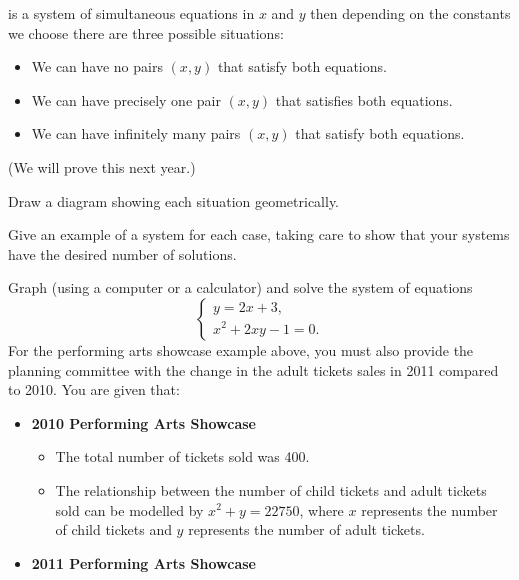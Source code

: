 \begin{questions}
            is a system of simultaneous equations in $ x $ and $ y $ then depending on the constants we choose there are
            three possible situations:
            \begin{itemize}
              \item We can have no pairs $ (x,y) $ that satisfy both equations.
              \item We can have precisely one pair $ (x,y) $ that satisfies both equations.
              \item We can have infinitely many pairs $ (x,y) $ that satisfy both equations.
            \end{itemize}
            (We will prove this next year.)
    \begin{parts}
      \item Draw a diagram showing each situation geometrically.
      \item Give an example of a system for each case, taking care to show that your systems
            have the desired number of solutions.
    \end{parts}
  \question Graph (using a computer or a calculator) and solve the system of equations
            \begin{displaymath}
              \begin{cases}
                y = 2x + 3,\\
                x^2 + 2xy - 1 = 0.
              \end{cases}
            \end{displaymath}
   For the performing arts showcase example above, you must
            also provide the planning committee with the change in the adult tickets sales in 2011 compared to 2010. You are
            given that:
            \begin{itemize}
              \item \textbf{2010 Performing Arts Showcase}
                \begin{itemize}
                  \item The total number of tickets sold was 400.
                  \item The relationship between the number of child tickets and adult tickets sold can be modelled by $ x^2 + y = 22750 $, where $x$
                        represents the number of child tickets and $y$ represents the number of adult tickets.
                \end{itemize}
              \item \textbf{2011 Performing Arts Showcase}

\end{itemize}
\end{questions}
